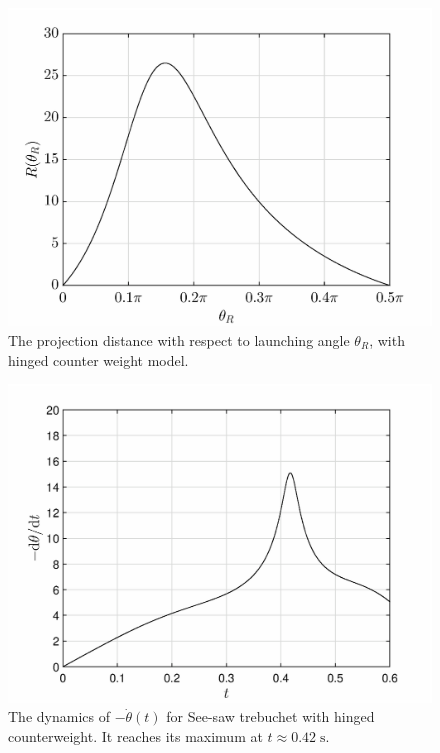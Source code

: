 \documentclass[%
reprint,
amsmath,amssymb,
aps,
]{revtex4-1}
\begin{document}
	\begin{figure}[h]
		\centering
		\includegraphics[scale=0.32]{hingedlbkRange.eps}
		\caption{The projection distance with respect to launching angle $\theta_R$, with hinged counter weight model.}
		\label{hingedrange}
	\end{figure}
	\begin{figure}[h]
		\centering
		\includegraphics[scale=0.32]{hingedlbkOMG.eps}
		\caption{The dynamics of $-\dot{\theta}(t)$ for See-saw trebuchet with hinged counterweight. It reaches its maximum at $t\approx 0.42\;\mathrm{s}$.}
		\label{hingedOMG}
	\end{figure}
	
\end{document}
